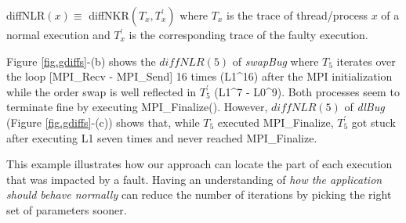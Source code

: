 diffNLR$(x) \equiv $ diffNKR$(T_x,T_x^\prime)$
%
where $T_x$ is the trace of thread/process $x$ of a normal execution and $T^\prime_x$ is the corresponding trace of the faulty execution.

Figure \ref{fig.gdiffs}-(b) shows the $diffNLR(5)$ of \textit{swapBug} where $T_5$ iterates over the loop [MPI\_Recv - MPI\_Send] 16 times (L1\^{}16) after the MPI initialization while the order swap is well reflected in $T_5^\prime$ (L1\^{}7 - L0\^{}9). Both processes seem to terminate fine by executing MPI\_Finalize(). 
However, $diffNLR(5)$ of \textit{dlBug} (Figure \ref{fig.gdiffs}-(c)) shows that, while $T_5$ executed MPI\_Finalize, $T_5^\prime$ got stuck after executing L1 seven times and never reached MPI\_Finalize.

This example illustrates how our approach can locate the part of each execution that was impacted by a fault. Having an understanding of \textit{how the application should behave normally} can reduce the number of iterations by picking the right set of parameters sooner. 








